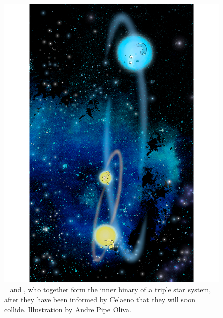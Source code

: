 \documentclass[main.tex]{subfiles}
\begin{document}
\begin{figure}
\includegraphics[width=\columnwidth,angle=270,origin=c]{ch3_1.pdf}
\caption{\rmtaygete~ and \rmalcyone, who together form the inner binary of a triple star system, after they have been informed by Celaeno that they will soon collide.  Illustration by Andre Pipe Oliva.
\label{fig:fig1}}
\end{figure}
\end{document}
